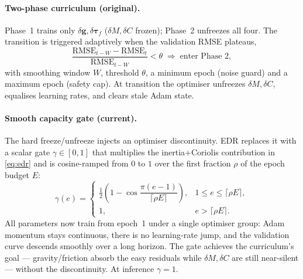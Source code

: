 \documentclass[11pt]{article}
\newcommand{\dg}{\delta\bm{g}}
\newcommand{\dM}{\delta\!M}
\newcommand{\dC}{\delta C}
\newcommand{\dtf}{\delta\bm{\tau}_f}
\newcommand{\half}{\tfrac{1}{2}}
\theoremstyle{definition}
\theoremstyle{plain}
\begin{document}
\paragraph{Two-phase curriculum (original).}
Phase~1 trains only $\dg,\dtf$ ($\dM,\dC$ frozen); Phase~2 unfreezes all four. The
transition is triggered adaptively when the validation RMSE plateaus,
\begin{equation}
\frac{\mathrm{RMSE}_{t-W}-\mathrm{RMSE}_t}{\mathrm{RMSE}_{t-W}}<\theta
\;\Longrightarrow\;\text{enter Phase~2},
\label{eq:plateau}
\end{equation}
with smoothing window $W$, threshold $\theta$, a minimum epoch (noise guard) and a
maximum epoch (safety cap). At transition the optimiser unfreezes $\dM,\dC$,
equalises learning rates, and clears stale Adam state.

\paragraph{Smooth capacity gate (current).}
The hard freeze/unfreeze injects an optimiser discontinuity. EDR replaces it with
a scalar gate $\gamma\in[0,1]$ that multiplies the inertia$+$Coriolis
contribution in \eqref{eq:edr} and is cosine-ramped from $0$ to $1$ over the first
fraction $\rho$ of the epoch budget $E$:
\begin{equation}
\gamma(e)=
\begin{cases}
\half\!\left(1-\cos\dfrac{\pi(e-1)}{\lceil\rho E\rceil}\right), & 1\le e\le\lceil\rho E\rceil,\\[8pt]
1, & e>\lceil\rho E\rceil.
\end{cases}
\label{eq:gamma}
\end{equation}
All parameters now train from epoch~1 under a single optimiser group: Adam
momentum stays continuous, there is no learning-rate jump, and the validation
curve descends smoothly over a long horizon. The gate achieves the curriculum's
goal --- gravity/friction absorb the easy residuals while $\dM,\dC$ are still
near-silent --- without the discontinuity. At inference $\gamma=1$.

\end{document}
